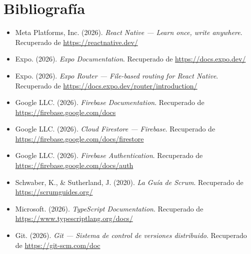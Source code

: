 \documentclass[12pt,letterpaper]{article}
\begin{document}
\section{Bibliografía}

\begin{itemize}[leftmargin=1.6em]
\item Meta Platforms, Inc. (2026). \textit{React Native --- Learn once, write anywhere}. Recuperado de \url{https://reactnative.dev/}
\item Expo. (2026). \textit{Expo Documentation}. Recuperado de \url{https://docs.expo.dev/}
\item Expo. (2026). \textit{Expo Router --- File-based routing for React Native}. Recuperado de \url{https://docs.expo.dev/router/introduction/}
\item Google LLC. (2026). \textit{Firebase Documentation}. Recuperado de \url{https://firebase.google.com/docs}
\item Google LLC. (2026). \textit{Cloud Firestore --- Firebase}. Recuperado de \url{https://firebase.google.com/docs/firestore}
\item Google LLC. (2026). \textit{Firebase Authentication}. Recuperado de \url{https://firebase.google.com/docs/auth}
\item Schwaber, K., \& Sutherland, J. (2020). \textit{La Guía de Scrum}. Recuperado de \url{https://scrumguides.org/}
\item Microsoft. (2026). \textit{TypeScript Documentation}. Recuperado de \url{https://www.typescriptlang.org/docs/}
\item Git. (2026). \textit{Git --- Sistema de control de versiones distribuido}. Recuperado de \url{https://git-scm.com/doc}
\end{itemize}
\end{document}
